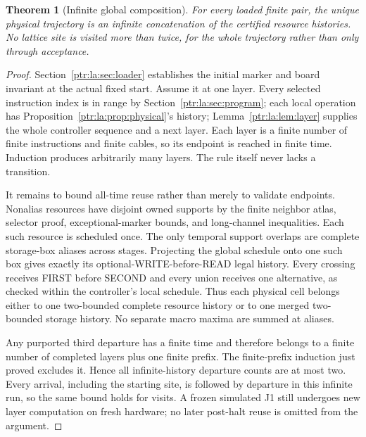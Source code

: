 \documentclass[11pt,letterpaper]{article}
\newtheorem{theorem}{Theorem}[section]
\theoremstyle{definition}\newtheorem{definition}[theorem]{Definition}
\theoremstyle{remark}\newtheorem{remark}[theorem]{Remark}
\begin{document}
\begin{theorem}[Infinite global composition]\label{ptr:la:thm:global}
For every loaded finite pair, the unique physical trajectory is an infinite concatenation of the certified resource histories. No lattice site is visited more than twice, for the whole trajectory rather than only through acceptance.
\end{theorem}
\begin{proof}
Section~\ref{ptr:la:sec:loader} establishes the initial marker and board invariant at the actual fixed start. Assume it at one layer. Every selected instruction index is in range by Section~\ref{ptr:la:sec:program}; each local operation has Proposition~\ref{ptr:la:prop:physical}'s history; Lemma~\ref{ptr:la:lem:layer} supplies the whole controller sequence and a next layer. Each layer is a finite number of finite instructions and finite cables, so its endpoint is reached in finite time. Induction produces arbitrarily many layers. The rule itself never lacks a transition.

It remains to bound all-time reuse rather than merely to validate endpoints. Nonalias resources have disjoint owned supports by the finite neighbor atlas, selector proof, exceptional-marker bounds, and long-channel inequalities. Each such resource is scheduled once. The only temporal support overlaps are complete storage-box aliases across stages. Projecting the global schedule onto one such box gives exactly its optional-WRITE-before-READ legal history. Every crossing receives FIRST before SECOND and every union receives one alternative, as checked within the controller's local schedule. Thus each physical cell belongs either to one two-bounded complete resource history or to one merged two-bounded storage history. No separate macro maxima are summed at aliases.

Any purported third departure has a finite time and therefore belongs to a finite number of completed layers plus one finite prefix. The finite-prefix induction just proved excludes it. Hence all infinite-history departure counts are at most two. Every arrival, including the starting site, is followed by departure in this infinite run, so the same bound holds for visits. A frozen simulated J1 still undergoes new layer computation on fresh hardware; no later post-halt reuse is omitted from the argument.
\end{proof}
\end{document}
